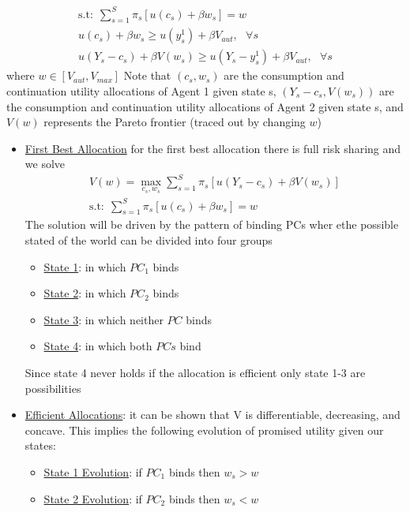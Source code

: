 \documentclass{article}
\begin{document}
\begin{itemize}
\begin{gather*}
        \text{s.t:} \ \ \sum_{s=1}^{S} \pi_{s} [u(c_{s}) + \beta w_{s}] = w \\
        u(c_{s}) + \beta w_{s} \geq u(y_{s}^{1}) + \beta V_{aut}, \ \ \ \forall s \\
        u(Y_{s} - c_{s}) + \beta V(w_{s}) \geq u(Y_{s} - y_{s}^{1}) + \beta V_{aut}, \ \ \ \forall s
    \end{gather*}
    where $w \in [V_{aut}, V_{max}]$
    Note that $(c_{s}, w_{s})$ are the consumption and continuation utility allocations of Agent 1 given state s, $(Y_{s} - c_{s}, V(w_{s}))$ are the consumption and continuation utility allocations of Agent 2 given state s, and $V(w)$ represents the Pareto frontier (traced out by changing $w$)
    \begin{itemize}
        \item  \underline{First Best Allocation} for the first best allocation there is full risk sharing and we solve
        \begin{gather*}
            V(w) = \max_{c_{s}, w_{s}} \sum_{s=1}^{S} \pi_{s} [u(Y_{s} - c_{s}) + \beta V(w_{s})] \\
            \text{s.t:} \ \ \sum_{s=1}^{S} \pi_{s} [u(c_{s}) + \beta w_{s}] = w
        \end{gather*}
        The solution will be driven by the pattern of binding PCs wher ethe possible stated of the world can be divided into four groups
        \begin{itemize}
            \item  \underline{State 1}: in which $PC_{1}$ binds
            \item  \underline{State 2}: in which $PC_{2}$ binds
            \item  \underline{State 3}: in which neither $PC$ binds
            \item  \underline{State 4}: in which both $PCs$ bind
        \end{itemize}
        Since state 4 never holds if the allocation is efficient only state 1-3 are possibilities
        \item \underline{Efficient Allocations}: it can be shown that V is differentiable, decreasing, and concave. This implies the following evolution of promised utility given our states:
        \begin{itemize}
            \item  \underline{State 1 Evolution}: if $PC_{1}$ binds then $w_{s} > w$
            \item  \underline{State 2 Evolution}: if $PC_{2}$ binds then $w_{s} < w$

\end{itemize}
\end{itemize}
\end{itemize}
\end{document}

